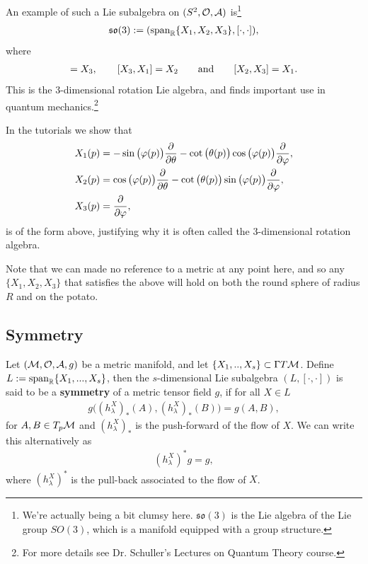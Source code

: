 \documentclass[12pt]{article} %
\begin{document}
\bex 
    An example of such a Lie subalgebra on $(S^2,\mathcal{O},\mathcal{A})$ is\footnote{We're actually being a bit clumsy here. $\mathfrak{so}(3)$ is the Lie algebra of the Lie group $SO(3)$, which is a manifold equipped with a group structure.}
    \begin{align*} 
        \mathfrak{so}(3) := (\text{span}_{\mathbb{R}}\{X_1,X_2,X_3\}, [\cdot,\cdot]),
    \end{align*}
    where 
    \begin{align*} 
        [X_1,X_2] = X_3, \qquad [X_3,X_1] = X_2 \qand [X_2,X_3] = X_1.
    \end{align*} 
    This is the 3-dimensional rotation Lie algebra, and finds important use in quantum mechanics.\footnote{For more details see Dr. Schuller's Lectures on Quantum Theory course.}
\eex 

\br 
    In the tutorials we show that 
    \begin{align*} 
        \begin{split}
            X_1(p) & = -\sin\big(\varphi(p)\big) \frac{\partial}{\partial \theta} - \cot\big(\theta(p)\big)\cos\big(\varphi(p)\big)\frac{\partial}{\partial \varphi}, \\
            X_2(p) & = \cos\big(\varphi(p)\big) \frac{\partial}{\partial \theta} - \cot\big(\theta(p)\big)\sin\big(\varphi(p)\big) \frac{\partial}{\partial \varphi}, \\
             X_3(p) & = \frac{\partial}{\partial \varphi},
        \end{split}
    \end{align*} 
    is of the form above, justifying why it is often called the 3-dimensional rotation algebra. 
\er 

Note that we can made no reference to a metric at any point here, and so any $\{X_1,X_2,X_3\}$ that satisfies the above will hold on both the round sphere of radius $R$ and on the potato. 

\subsection{Symmetry}

    Let $(\mathcal{M},\mathcal{O},\mathcal{A},g)$ be a metric manifold, and let $\{X_1,..,X_s\} \subset \Gamma T\mathcal{M}$. Define $L := \text{span}_{\mathbb{R}}\{X_1,...,X_s\}$, then the $s$-dimensional Lie subalgebra $(L,[\cdot,\cdot])$ is said to be a \textbf{symmetry} of a metric tensor field $g$, if for all $X\in L$
    \begin{align*} 
        g\big( (h^X_{\lambda})_*(A), (h^X_{\lambda})_*(B)\big) = g(A,B),
    \end{align*}
    for $A,B\in T_p\mathcal{M}$ and $(h^X_{\lambda})_*$ is the push-forward of the flow of $X$. We can write this alternatively as 
    \begin{align*} 
        (h_{\lambda}^X)^*g = g,
    \end{align*} 
    where $(h_{\lambda}^X)^*$ is the pull-back associated to the flow of $X$.
\ed 
\end{document}
